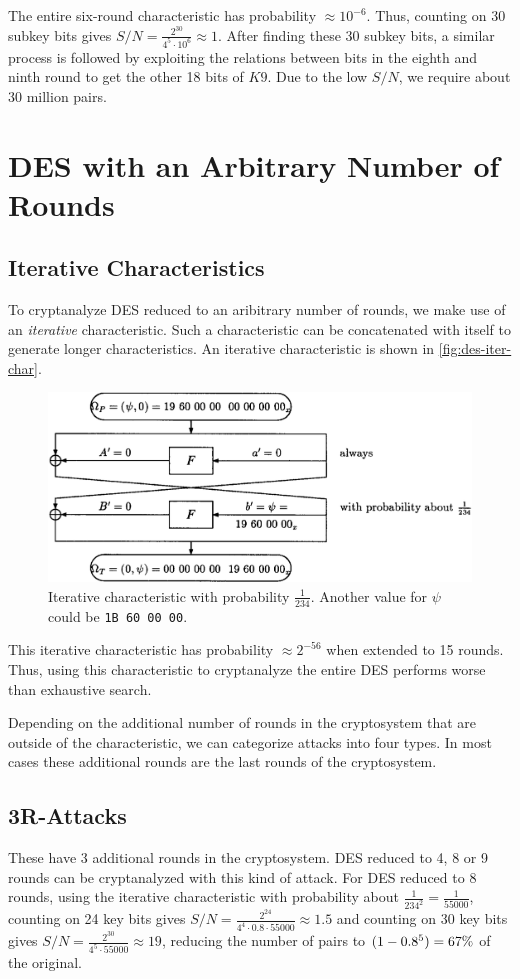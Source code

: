 \documentclass[twoside]{article}
\begin{document}
The entire six-round characteristic has probability \(\approx 10^{-6}\). Thus,
counting on 30 subkey bits gives \(S/N = \frac{2^{30}}{4^5 \cdot 10^6} \approx
1\). After finding these 30 subkey bits, a similar process is followed by
exploiting the relations between bits in the eighth and ninth round to get the
other 18 bits of \(K9\). Due to the low \(S/N\), we require about 30 million
pairs.

\section{DES with an Arbitrary Number of Rounds}

\subsection{Iterative Characteristics}
To cryptanalyze DES reduced to an aribitrary number of rounds, we make use of an
\emph{iterative} characteristic. Such a characteristic can be concatenated with
itself to generate longer characteristics. An iterative characteristic is shown
in \autoref{fig:des-iter-char}.

\begin{figure}[!ht]
    \centering
    \includegraphics[width=0.5\linewidth]{images/des_iter_char.png}
    \caption{Iterative characteristic with probability \(\frac{1}{234}\). Another value for \(\psi\) could be \texttt{1B 60 00 00}.}
    \label{fig:des-iter-char}
\end{figure}

This iterative characteristic has probability \(\approx 2^{-56}\) when extended
to 15 rounds. Thus, using this characteristic to cryptanalyze the entire DES
performs worse than exhaustive search.

Depending on the additional number of rounds in the cryptosystem that are
outside of the characteristic, we can categorize attacks into four types. In
most cases these additional rounds are the last rounds of the cryptosystem.

\subsection{3R-Attacks}
These have 3 additional rounds in the cryptosystem. DES reduced to 4, 8 or 9
rounds can be cryptanalyzed with this kind of attack. For DES reduced to 8
rounds, using the iterative characteristic with probability about
\(\frac{1}{234^2} = \frac{1}{55000}\), counting on 24 key bits gives \(S/N =
\frac{2^{24}}{4^4 \cdot 0.8 \cdot 55000} \approx 1.5\) and counting on 30 key
bits gives \(S/N = \frac{2^{30}}{4^5 \cdot 55000} \approx 19\), reducing the
number of pairs to \((1 - 0.8^5) = 67 \%\) of the original.
\end{document}
